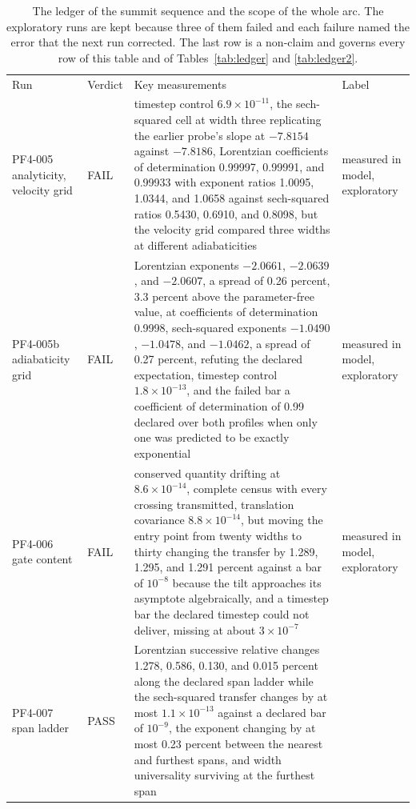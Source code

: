 \documentclass[aps,pre,reprint,nofootinbib,floatfix]{revtex4-2}
\begin{document}
\begin{table}[p]
\caption{The ledger of the summit sequence and the scope of the whole
arc.  The exploratory runs are kept because three of them failed and
each failure named the error that the next run corrected.  The last row
is a non-claim and governs every row of this table and of
Tables~\ref{tab:ledger} and \ref{tab:ledger2}.}
\label{tab:ledger3}
\begin{ruledtabular}
\footnotesize
\begin{tabular}{L{2.5cm}lL{9.4cm}L{3.0cm}}
Run & Verdict & Key measurements & Label \\
\colrule
PF4-005 analyticity, velocity grid & FAIL & timestep control
$6.9\times10^{-11}$, the sech-squared cell at width three replicating
the earlier probe's slope at $-7.8154$ against $-7.8186$, Lorentzian
coefficients of determination 0.99997, 0.99991, and 0.99933 with
exponent ratios 1.0095, 1.0344, and 1.0658 against sech-squared ratios
0.5430, 0.6910, and 0.8098, but the velocity grid compared three widths
at different adiabaticities & measured in model, exploratory \\
PF4-005b adiabaticity grid & FAIL & Lorentzian exponents $-2.0661$,
$-2.0639$, and $-2.0607$, a spread of 0.26 percent, 3.3 percent above
the parameter-free value, at coefficients of determination 0.9998,
sech-squared exponents $-1.0490$, $-1.0478$, and $-1.0462$, a spread of
0.27 percent, refuting the declared expectation, timestep control
$1.8\times10^{-13}$, and the failed bar a coefficient of determination
of 0.99 declared over both profiles when only one was predicted to be
exactly exponential & measured in model, exploratory \\
PF4-006 gate content & FAIL & conserved quantity drifting at
$8.6\times10^{-14}$, complete census with every crossing transmitted,
translation covariance $8.8\times10^{-14}$, but moving the entry point
from twenty widths to thirty changing the transfer by 1.289, 1.295, and
1.291 percent against a bar of $10^{-8}$ because the tilt approaches
its asymptote algebraically, and a timestep bar the declared timestep
could not deliver, missing at about $3\times10^{-7}$ & measured in
model, exploratory \\
PF4-007 span ladder & PASS & Lorentzian successive relative changes
1.278, 0.586, 0.130, and 0.015 percent along the declared span ladder
while the sech-squared transfer changes by at most $1.1\times10^{-13}$
against a declared bar of $10^{-9}$,
the exponent changing by at most 0.23 percent between the nearest and
furthest spans, and width universality surviving at the furthest span

\end{tabular}
\end{ruledtabular}
\end{table}
\end{document}
